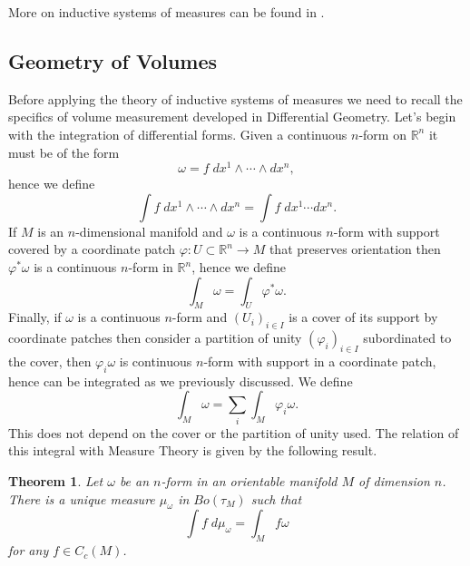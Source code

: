\documentclass[%
 aip,
 amsmath,amssymb,
 reprint,%
jmp]{revtex4-2}
\newtheorem{theorem}{Theorem}[section]
\begin{document}
More on inductive systems of measures can be found in \cite{Macheras}.

\subsection{Geometry of Volumes}

Before applying the theory of inductive systems of measures we need to recall the specifics of volume measurement developed in Differential Geometry. Let's begin with the integration of differential forms. Given a continuous $n$-form on $\mathbb{R}^{n}$ it must be of the form
\begin{equation*}
    \omega = f \;dx^{1}\wedge\cdots\wedge dx^{n},
\end{equation*}
hence we define
\begin{equation*}
    \int f \;dx^{1}\wedge\cdots\wedge dx^{n} = \int f \;dx^{1}\cdots dx^{n}.
\end{equation*}
If $M$ is an $n$-dimensional manifold and $\omega$ is a continuous $n$-form with support covered by a coordinate patch $\varphi\colon U \subset \mathbb{R}^{n} \to M$ that preserves orientation then $\varphi^{\ast}\omega$ is a continuous $n$-form in $\mathbb{R}^{n}$, hence we define
\begin{equation*}
    \int_{M} \omega = \int_{U} \varphi^{\ast}\omega.
\end{equation*}
Finally, if $\omega$ is a continuous $n$-form and $(U_{i})_{i\in I}$ is a cover of its support by coordinate patches then consider a partition of unity $(\varphi_{i})_{i\in I}$ subordinated to the cover, then $\varphi_{i}\omega$ is continuous $n$-form with support in a coordinate patch, hence can be integrated as we previously discussed. We define
\begin{equation*}
    \int_{M}\omega = \sum_{i}\int_{M}\varphi_{i}\omega.
\end{equation*}
This does not depend on the cover or the partition of unity used. The relation of this integral with Measure Theory is given by the following result.

\begin{theorem}
Let $\omega$ be an $n$-form in an orientable manifold $M$ of dimension $n$. There is a unique measure $\mu_{\omega}$ in $Bo(\tau_{M})$ such that
\begin{equation*}
    \int f\;d\mu_{\omega} = \int_{M} f \omega
\end{equation*}
 for any $f\in C_{c}(M)$.
\end{theorem}
\end{document}
